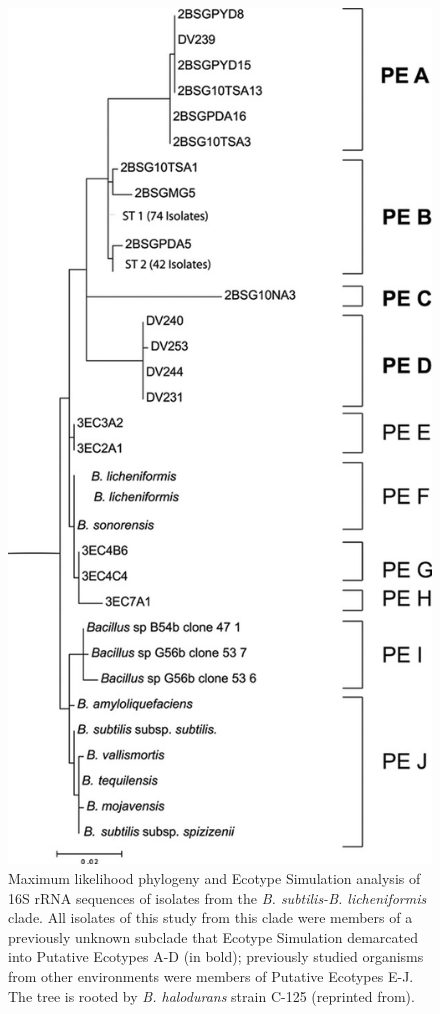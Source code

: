 \begin{figure}[h!]
\centering
\includegraphics[scale=0.45]{images/DeathValleyES-CH2}
\caption[Example ES analysis of 16s rRNA sequences of isolates from the \emph{B. subtilis-B.licheniformis} clade.]{Maximum likelihood phylogeny and Ecotype Simulation analysis of 16S rRNA sequences of isolates from the \emph{B. subtilis-B. licheniformis} clade. All isolates of this study from this clade were members of a previously unknown subclade that Ecotype Simulation demarcated into Putative Ecotypes A-D (in bold); previously studied organisms from other environments were members of Putative Ecotypes E-J. The tree is rooted by \emph{B. halodurans} strain C-125 (reprinted from\protect\cite{kim2012diversity}).}
\label{fig:DeathES}
\end{figure}

